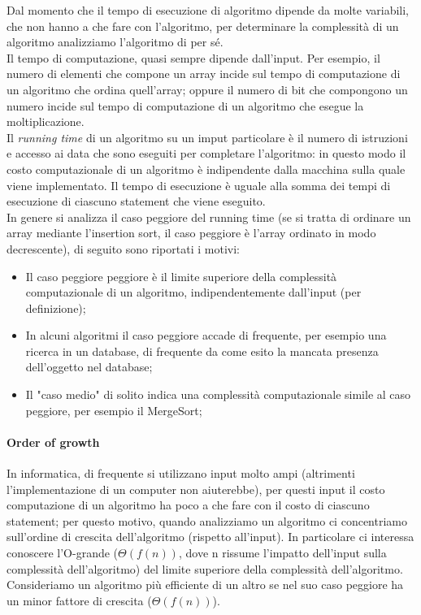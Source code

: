 \documentclass{article}
\begin{document}
Dal momento che il tempo di esecuzione di algoritmo dipende da molte variabili,
che non hanno a che fare con l'algoritmo, per determinare la complessità
di un algoritmo analizziamo l'algoritmo di per sé.\\
Il tempo di computazione, quasi sempre dipende dall'input. Per esempio, il
numero di elementi che compone un array incide sul tempo di computazione di un
algoritmo che ordina quell'array; oppure il numero di bit che compongono un
numero incide sul tempo di computazione di un algoritmo che esegue la
moltiplicazione.\\
Il \textit{running time} di un algoritmo su un imput particolare è il numero di
istruzioni e accesso ai data che sono eseguiti per completare l'algoritmo: in
questo modo il costo computazionale di un algoritmo è indipendente dalla
macchina sulla quale viene implementato.
Il tempo di esecuzione è uguale alla somma dei tempi di esecuzione di ciascuno
statement che viene eseguito.\\
In genere si analizza il caso peggiore del running time (se si tratta di
ordinare un array mediante l'insertion sort, il caso peggiore è l'array ordinato
in modo decrescente), di seguito sono riportati i motivi:
\begin{itemize}
    \item Il caso peggiore peggiore è il limite superiore della complessità
        computazionale di un algoritmo, indipendentemente dall'input (per
        definizione);
    \item In alcuni algoritmi il caso peggiore accade di frequente, per esempio
        una ricerca in un database, di frequente da come esito la mancata
        presenza dell'oggetto nel database;
    \item Il "caso medio" di solito indica una complessità computazionale simile
        al caso peggiore, per esempio il MergeSort;
\end{itemize}

\paragraph{Order of growth}
In informatica, di frequente si utilizzano input molto ampi (altrimenti
l'implementazione di un computer non aiuterebbe), per questi input il costo
computazione di un algoritmo ha poco a che fare con il costo di ciascuno
statement; per questo motivo, quando analizziamo un algoritmo ci concentriamo
sull'ordine di crescita dell'algoritmo (rispetto all'input). In particolare ci
interessa conoscere l'O-grande ($\Theta(f(n))$, dove n rissume l'impatto 
dell'input sulla complessità dell'algoritmo) del limite superiore della
complessità dell'algoritmo.\\
Consideriamo un algoritmo più efficiente di un altro se nel suo caso peggiore ha
un minor fattore di crescita ($\Theta(f(n))$).
\end{document}
